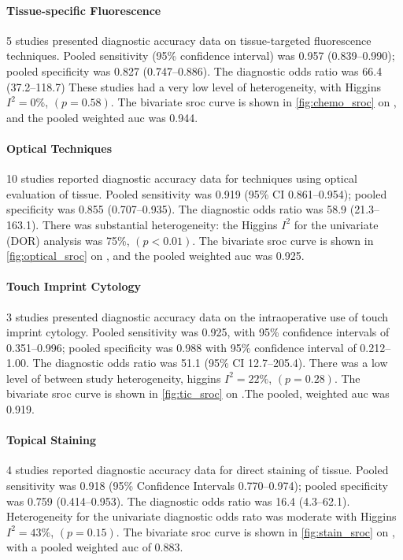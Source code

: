\paragraph{Tissue-specific Fluorescence}

5 studies presented diagnostic accuracy data on tissue-targeted fluorescence techniques.
Pooled sensitivity (95\% confidence interval) was 0.957 (0.839--0.990); pooled specificity was 0.827 (0.747--0.886).
The diagnostic odds ratio was 66.4 (37.2--118.7)
These studies had a very low level of heterogeneity, with Higgins $I^2 = 0\%$, $(p=0.58)$.
The bivariate \gls{sroc} curve is shown in \cref{fig:chemo_sroc} on , and the pooled weighted \gls{auc} was 0.944.

\paragraph{Optical Techniques}

10 studies reported diagnostic accuracy data for techniques using optical evaluation of tissue.
Pooled sensitivity was 0.919 (95\% CI 0.861--0.954); pooled specificity was 0.855 (0.707--0.935).
The diagnostic odds ratio was 58.9 (21.3--163.1).
There was substantial heterogeneity: the Higgins $I^2$ for the univariate (DOR) analysis was 75\%, $(p<0.01)$.
The bivariate \gls{sroc} curve is shown in \cref{fig:optical_sroc} on , and the pooled weighted \gls{auc} was 0.925.

\paragraph{Touch Imprint Cytology}

3 studies presented diagnostic accuracy data on the intraoperative use of touch imprint cytology.
Pooled sensitivity was 0.925, with 95\% confidence intervals of 0.351--0.996; pooled specificity was 0.988 with 95\% confidence interval of 0.212--1.00.
The diagnostic odds ratio was 51.1 (95\% CI 12.7--205.4).
There was a low level of between study heterogeneity, higgins $I^2 = 22\%$, $(p=0.28)$.
The bivariate \gls{sroc} curve is shown in \cref{fig:tic_sroc} on .The pooled, weighted \gls{auc} was 0.919.

\paragraph{Topical Staining}

4 studies reported diagnostic accuracy data for direct staining of tissue.
Pooled sensitivity was 0.918 (95\% Confidence Intervals 0.770--0.974); pooled specificity was 0.759 (0.414--0.953).
The diagnostic odds ratio was 16.4 (4.3--62.1).
Heterogeneity for the univariate diagnostic odds rato was moderate with Higgins $I^2 = 43\%$, $(p=0.15)$.
The bivariate \gls{sroc} curve is shown in \cref{fig:stain_sroc} on , with a pooled weighted \gls{auc} of 0.883.



